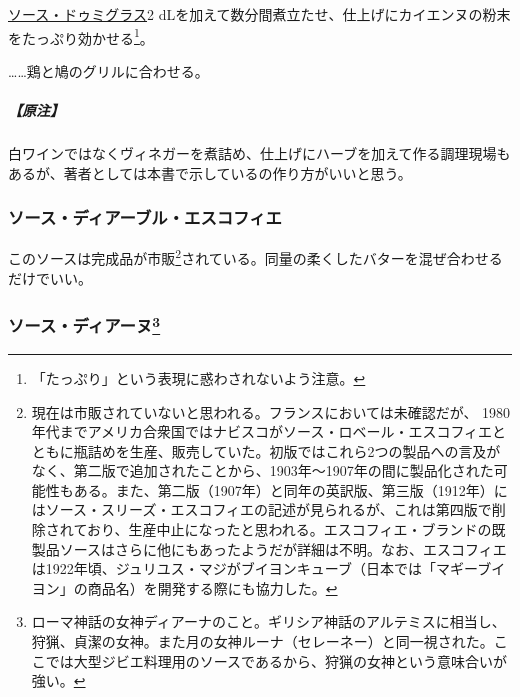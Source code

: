 \begin{recette}
\protect\hyperlink{sauce-demi-glace}{ソース・ドゥミグラス}2
dLを加えて数分間煮立たせ、仕上げにカイエンヌの粉末をたっぷり効かせる\footnote{「たっぷり」という表現に惑わされないよう注意。}。

\ldots{}\ldots{}鶏と鳩のグリルに合わせる。

\hypertarget{nota-sauce-diable}{%
\subparagraph{【原注】}\label{nota-sauce-diable}}

白ワインではなくヴィネガーを煮詰め、仕上げにハーブを加えて作る調理現場もあるが、著者としては本書で示しているの作り方がいいと思う。

\hypertarget{sauce-diable-escoffier}{%
\subsubsection{ソース・ディアーブル・エスコフィエ}\label{sauce-diable-escoffier}}



このソースは完成品が市販\footnote{現在は市販されていないと思われる。フランスにおいては未確認だが、
  1980年代までアメリカ合衆国ではナビスコがソース・ロベール・エスコフィエとともに瓶詰めを生産、販売していた。初版ではこれら2つの製品への言及がなく、第二版で追加されたことから、1903年〜1907年の間に製品化された可能性もある。また、第二版（1907年）と同年の英訳版、第三版（1912年）にはソース・スリーズ・エスコフィエの記述が見られるが、これは第四版で削除されており、生産中止になったと思われる。エスコフィエ・ブランドの既製品ソースはさらに他にもあったようだが詳細は不明。なお、エスコフィエは1922年頃、ジュリユス・マジがブイヨンキューブ（日本では「マギーブイヨン」の商品名）を開発する際にも協力した。}されている。同量の柔くしたバターを混ぜ合わせるだけでいい。

\hypertarget{sauce-diane}{%
\subsubsection[ソース・ディアーヌ]{\texorpdfstring{ソース・ディアーヌ\footnote{ローマ神話の女神ディアーナのこと。ギリシア神話のアルテミスに相当し、狩猟、貞潔の女神。また月の女神ルーナ（セレーネー）と同一視された。ここでは大型ジビエ料理用のソースであるから、狩猟の女神という意味合いが強い。}}{ソース・ディアーヌ}}\label{sauce-diane}}


\end{recette}
